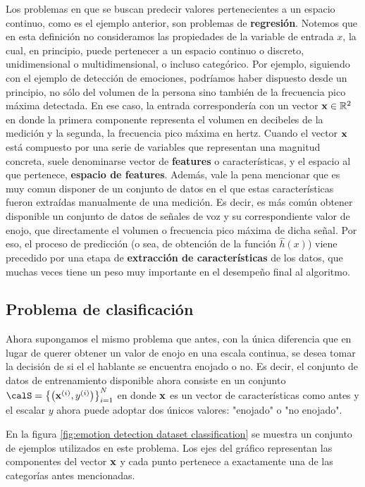 Los problemas en que se buscan predecir valores pertenecientes a un espacio continuo, como es el ejemplo anterior, son problemas de \textbf{regresión}. Notemos que en esta definición no consideramos las propiedades de la variable de entrada $x$, la cual, en principio, puede pertenecer a un espacio continuo o discreto, unidimensional o multidimensional, o incluso categórico. Por ejemplo, siguiendo con el ejemplo de detección de emociones, podríamos haber dispuesto desde un principio, no sólo del volumen de la persona sino también de la frecuencia pico máxima detectada. En ese caso, la entrada correspondería con un vector $\mathbf{x} \in \mathbb{R}^2$ en donde la primera componente representa el volumen en decibeles de la medición y la segunda, la frecuencia pico máxima en hertz. Cuando el vector $\mathbf{x}$ está compuesto por una serie de variables que representan una magnitud concreta, suele denominarse vector de \textbf{features} o características, y el espacio al que pertenece, \textbf{espacio de features}. Además, vale la pena mencionar que es muy comun disponer de un conjunto de datos en el que estas características fueron extraídas manualmente de una medición. Es decir, es más común obtener disponible un conjunto de datos de señales de voz y su correspondiente valor de enojo, que directamente el volumen o frecuencia pico máxima de dicha señal. Por eso, el proceso de predicción (o sea, de obtención de la función $\hat{h}(x)$) viene precedido por una etapa de \textbf{extracción de características} de los datos, que muchas veces tiene un peso muy importante en el desempeño final al algoritmo.


\subsection{Problema de clasificación}

Ahora supongamos el mismo problema que antes, con la única diferencia que en lugar de querer obtener un valor de enojo en una escala continua, se desea tomar la decisión de si el el hablante se encuentra enojado o no. Es decir, el conjunto de datos de entrenamiento disponible ahora consiste en un conjunto $\calS = \datasup{\xbf}{y}$ en donde $\mathbf{x}$ es un vector de características como antes y el escalar $y$ ahora puede adoptar dos únicos valores: "enojado" o "no enojado". 

En la figura \ref{fig:emotion detection dataset classification} se muestra un conjunto de ejemplos utilizados en este problema. Los ejes del gráfico representan las componentes del vector $\mathbf{x}$ y cada punto pertenece a exactamente una de las categorías antes mencionadas. 

